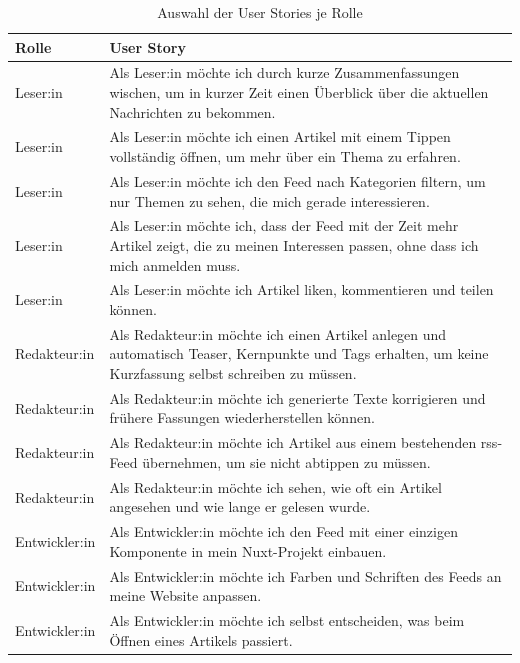 \begin{table}
    \centering
    \small
    \begin{tabularx}{\textwidth}{l >{\raggedright\arraybackslash}X}
        \toprule
        \textbf{Rolle} & \textbf{User Story} \\
        \midrule
        Leser:in & Als Leser:in möchte ich durch kurze Zusammenfassungen wischen, um in kurzer Zeit einen Überblick über die aktuellen Nachrichten zu bekommen. \\
        Leser:in & Als Leser:in möchte ich einen Artikel mit einem Tippen vollständig öffnen, um mehr über ein Thema zu erfahren. \\
        Leser:in & Als Leser:in möchte ich den Feed nach Kategorien filtern, um nur Themen zu sehen, die mich gerade interessieren. \\
        Leser:in & Als Leser:in möchte ich, dass der Feed mit der Zeit mehr Artikel zeigt, die zu meinen Interessen passen, ohne dass ich mich anmelden muss. \\
        Leser:in & Als Leser:in möchte ich Artikel liken, kommentieren und teilen können. \\
        Redakteur:in & Als Redakteur:in möchte ich einen Artikel anlegen und automatisch Teaser, Kernpunkte und Tags erhalten, um keine Kurzfassung selbst schreiben zu müssen. \\
        Redakteur:in & Als Redakteur:in möchte ich generierte Texte korrigieren und frühere Fassungen wiederherstellen können. \\
        Redakteur:in & Als Redakteur:in möchte ich Artikel aus einem bestehenden \gls{rss}-Feed übernehmen, um sie nicht abtippen zu müssen. \\
        Redakteur:in & Als Redakteur:in möchte ich sehen, wie oft ein Artikel angesehen und wie lange er gelesen wurde. \\
        Entwickler:in & Als Entwickler:in möchte ich den Feed mit einer einzigen Komponente in mein Nuxt-Projekt einbauen. \\
        Entwickler:in & Als Entwickler:in möchte ich Farben und Schriften des Feeds an meine Website anpassen. \\
        Entwickler:in & Als Entwickler:in möchte ich selbst entscheiden, was beim Öffnen eines Artikels passiert. \\
        \bottomrule
    \end{tabularx}
    \caption{Auswahl der User Stories je Rolle}
    \label{tab:req:stories}
\end{table}

